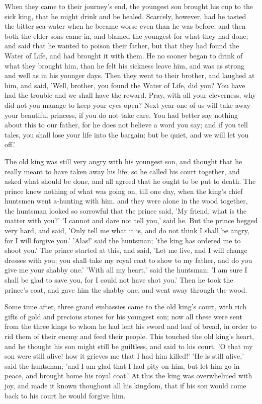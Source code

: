 \documentclass[12pt]{book}
\begin{document}
When they came to their journey's end, the youngest son brought his
cup to the sick king, that he might drink and be healed. Scarcely,
however, had he tasted the bitter sea-water when he became worse even
than he was before; and then both the elder sons came in, and blamed
the youngest for what they had done; and said that he wanted to poison
their father, but that they had found the Water of Life, and had
brought it with them. He no sooner began to drink of what they brought
him, than he felt his sickness leave him, and was as strong and well
as in his younger days. Then they went to their brother, and laughed
at him, and said, 'Well, brother, you found the Water of Life, did
you? You have had the trouble and we shall have the reward. Pray, with
all your cleverness, why did not you manage to keep your eyes open?
Next year one of us will take away your beautiful princess, if you do
not take care. You had better say nothing about this to our father,
for he does not believe a word you say; and if you tell tales, you
shall lose your life into the bargain: but be quiet, and we will let
you off.'

The old king was still very angry with his youngest son, and thought
that he really meant to have taken away his life; so he called his
court together, and asked what should be done, and all agreed that he
ought to be put to death. The prince knew nothing of what was going
on, till one day, when the king's chief huntsmen went a-hunting with
him, and they were alone in the wood together, the huntsman looked so
sorrowful that the prince said, 'My friend, what is the matter with
you?' 'I cannot and dare not tell you,' said he. But the prince begged
very hard, and said, 'Only tell me what it is, and do not think I
shall be angry, for I will forgive you.' 'Alas!' said the huntsman;
'the king has ordered me to shoot you.' The prince started at this,
and said, 'Let me live, and I will change dresses with you; you shall
take my royal coat to show to my father, and do you give me your
shabby one.' 'With all my heart,' said the huntsman; 'I am sure I
shall be glad to save you, for I could not have shot you.' Then he
took the prince's coat, and gave him the shabby one, and went away
through the wood.

Some time after, three grand embassies came to the old king's court,
with rich gifts of gold and precious stones for his youngest son; now
all these were sent from the three kings to whom he had lent his sword
and loaf of bread, in order to rid them of their enemy and feed their
people. This touched the old king's heart, and he thought his son
might still be guiltless, and said to his court, 'O that my son were
still alive! how it grieves me that I had him killed!' 'He is still
alive,' said the huntsman; 'and I am glad that I had pity on him, but
let him go in peace, and brought home his royal coat.' At this the
king was overwhelmed with joy, and made it known thoughout all his
kingdom, that if his son would come back to his court he would forgive
him.
\end{document}
